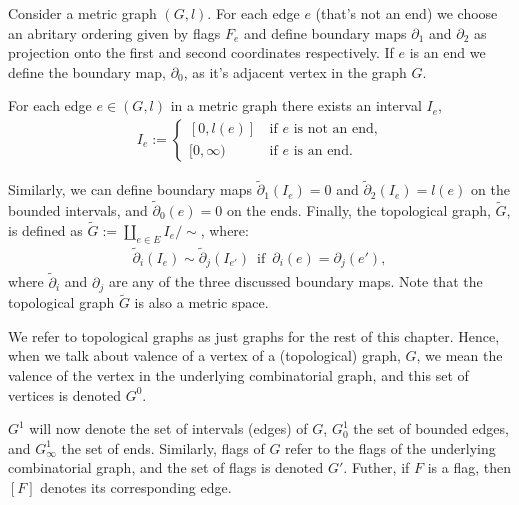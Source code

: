 \begin{definition}
    Consider a metric graph $(G,l)$.
    For each edge $e$ (that's not an end) we choose an abritary ordering given by flags $F_{e}$ and define boundary maps $\partial_{1}$ and $\partial_{2}$ as projection onto the first and second coordinates respectively. 
    If $e$ is an end we define the boundary map, $\partial_{0}$, as it's adjacent vertex in the graph $G$.
    \par For each edge $e \in (G,l)$ in a metric graph there exists an interval $I_{e}$, 
    \begin{align*}
        I_e := 
        \begin{cases}
            [0,l(e)]\,& \text{if }e \text{ is not an end,}\\
            [0,\infty)\, & \text{if }e \text{ is an end}.
        \end{cases}
    \end{align*}
        \par Similarly, we can define boundary maps $\tilde \partial_{1}(I_{e}) = 0$ and $\tilde \partial_{2}(I_{e}) = l(e)$ on the bounded intervals, and  $\tilde \partial_{0} (e) = 0$ on the ends. 
        Finally, the topological graph, $\tilde G$, is defined as $\tilde G:=\coprod_{e \in E}I_{e}/\sim$, where:
        \begin{align*}
            \tilde \partial_{i} (I_{e}) \sim \tilde \partial_{j}(I_{e'}) \, \text{ if }\, \partial_{i} (e) =\partial_{j}(e'),
        \end{align*}
        where $\tilde \partial_{i}$ and $\partial_{j}$ are any of the three discussed boundary maps. Note that the topological graph $\tilde G$ is also a metric space.
\end{definition}

\begin{remark}
    We refer to topological graphs as just graphs for the rest of this chapter. 
    Hence, when we talk about valence of a vertex of a (topological) graph, $G$, we mean the valence of the vertex in the underlying combinatorial graph, and this set of vertices is denoted $G^{0}$.
    \par $G^{1}$ will now denote the set of intervals (edges) of $G$, $G^{1}_{0}$ the set of bounded edges, and $G^{1}_{\infty}$ the set of ends. 
    Similarly, flags of $G$ refer to the flags of the underlying combinatorial graph, and the set of flags is denoted $G'$. 
    Futher, if $F$ is a flag, then $[F]$ denotes its corresponding edge.
\end{remark}

